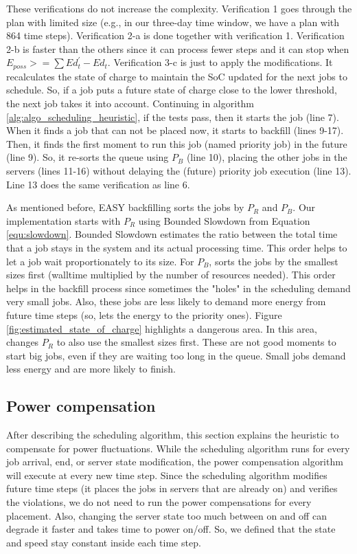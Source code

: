 These verifications do not increase the complexity. Verification 1 goes through the plan with limited size (e.g., in our three-day time window, we have a plan with 864 time steps). Verification 2-a is done together with verification 1. Verification 2-b is faster than the others since it can process fewer steps and it can stop when $E_{poss} >= \sum Ed_t^{'} - Ed_t$. Verification 3-c is just to apply the modifications. It recalculates the state of charge to maintain the SoC updated for the next jobs to schedule. So, if a job puts a future state of charge close to the lower threshold, the next job takes it into account. Continuing in algorithm \ref{alg:algo_scheduling_heuristic}, if the tests pass, then it starts the job (line 7). When it finds a job that can not be placed now, it starts to backfill (lines 9-17). Then, it finds the first moment to run this job (named priority job) in the future (line 9). So, it re-sorts the queue using $P_{B}$ (line 10), placing the other jobs in the servers (lines 11-16) without delaying the (future) priority job execution (line 13). Line 13 does the same verification as line 6.

As mentioned before, EASY backfilling sorts the jobs by $P_{R}$ and $P_{B}$. Our implementation starts with $P_{R}$ using Bounded Slowdown from Equation \ref{equ:slowdown}. Bounded Slowdown estimates the ratio between the total time that a job stays in the system and its actual processing time. This order helps to let a job wait proportionately to its size. For $P_{B}$, \emph{\systemName} sorts the jobs by the smallest sizes first (walltime multiplied by the number of resources needed). This order helps in the backfill process since sometimes the "holes" in the scheduling demand very small jobs. Also, these jobs are less likely to demand more energy from future time steps (so, \emph{\systemName} lets the energy to the priority ones). Figure \ref{fig:estimated_state_of_charge} highlights a dangerous area. In this area, \emph{\systemName} changes $P_{R}$ to also use the smallest sizes first. These are not good moments to start big jobs, even if they are waiting too long in the queue. Small jobs demand less energy and are more likely to finish.

\subsection{Power compensation}
\label{sec:model_compensations}

After describing the scheduling algorithm, this section explains the heuristic to compensate for power fluctuations. While the scheduling algorithm runs for every job arrival, end, or server state modification, the power compensation algorithm will execute at every new time step. Since the scheduling algorithm modifies future time steps (it places the jobs in servers that are already on) and verifies the violations, we do not need to run the power compensations for every placement. Also, changing the server state too much between on and off can degrade it faster and takes time to power on/off. So, we defined that the state and speed stay constant inside each time step. 

